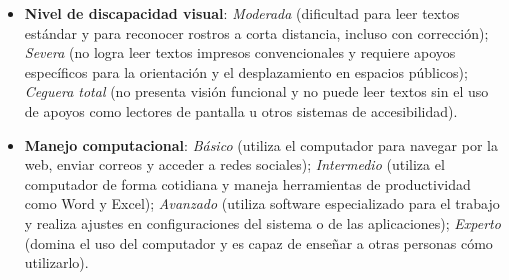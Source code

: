 \begin{itemize}
    \item \textbf{Nivel de discapacidad visual}: \textit{Moderada} (dificultad para leer textos estándar y para reconocer rostros a corta distancia, incluso con corrección); \textit{Severa} (no logra leer textos impresos convencionales y requiere apoyos específicos para la orientación y el desplazamiento en espacios públicos); \textit{Ceguera total} (no presenta visión funcional y no puede leer textos sin el uso de apoyos como lectores de pantalla u otros sistemas de accesibilidad).
    \item \textbf{Manejo computacional}: \textit{Básico} (utiliza el computador para navegar por la web, enviar correos y acceder a redes sociales); \textit{Intermedio} (utiliza el computador de forma cotidiana y maneja herramientas de productividad como Word y Excel); \textit{Avanzado} (utiliza software especializado para el trabajo y realiza ajustes en configuraciones del sistema o de las aplicaciones); \textit{Experto} (domina el uso del computador y es capaz de enseñar a otras personas cómo utilizarlo).
\end{itemize}

